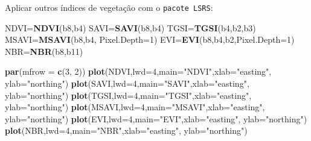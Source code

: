 \documentclass[
]{book}
\newenvironment{Shaded}{\begin{snugshade}}{\end{snugshade}}
\newcommand{\DataTypeTok}[1]{\textcolor[rgb]{0.13,0.29,0.53}{#1}}
\newcommand{\DecValTok}[1]{\textcolor[rgb]{0.00,0.00,0.81}{#1}}
\newcommand{\KeywordTok}[1]{\textcolor[rgb]{0.13,0.29,0.53}{\textbf{#1}}}
\newcommand{\NormalTok}[1]{#1}
\newcommand{\StringTok}[1]{\textcolor[rgb]{0.31,0.60,0.02}{#1}}
\begin{document}
Aplicar outros índices de vegetação com o \texttt{pacote\ LSRS}:

\begin{Shaded}
\begin{Highlighting}[]
\NormalTok{NDVI=}\KeywordTok{NDVI}\NormalTok{(b8,b4)}
\NormalTok{SAVI=}\KeywordTok{SAVI}\NormalTok{(b8,b4)}
\NormalTok{TGSI=}\KeywordTok{TGSI}\NormalTok{(b4,b2,b3)}
\NormalTok{MSAVI=}\KeywordTok{MSAVI}\NormalTok{(b8,b4, }\DataTypeTok{Pixel.Depth=}\DecValTok{1}\NormalTok{)}
\NormalTok{EVI=}\KeywordTok{EVI}\NormalTok{(b8,b4,b2,}\DataTypeTok{Pixel.Depth=}\DecValTok{1}\NormalTok{)}
\NormalTok{NBR=}\KeywordTok{NBR}\NormalTok{(b8,b11)}
\end{Highlighting}
\end{Shaded}

\begin{Shaded}
\begin{Highlighting}[]
\KeywordTok{par}\NormalTok{(}\DataTypeTok{mfrow =} \KeywordTok{c}\NormalTok{(}\DecValTok{3}\NormalTok{, }\DecValTok{2}\NormalTok{))}
\KeywordTok{plot}\NormalTok{(NDVI,}\DataTypeTok{lwd=}\DecValTok{4}\NormalTok{,}\DataTypeTok{main=}\StringTok{"NDVI"}\NormalTok{,}\DataTypeTok{xlab=}\StringTok{"easting"}\NormalTok{, }\DataTypeTok{ylab=}\StringTok{"northing"}\NormalTok{)}
\KeywordTok{plot}\NormalTok{(SAVI,}\DataTypeTok{lwd=}\DecValTok{4}\NormalTok{,}\DataTypeTok{main=}\StringTok{"SAVI"}\NormalTok{,}\DataTypeTok{xlab=}\StringTok{"easting"}\NormalTok{, }\DataTypeTok{ylab=}\StringTok{"northing"}\NormalTok{)}
\KeywordTok{plot}\NormalTok{(TGSI,}\DataTypeTok{lwd=}\DecValTok{4}\NormalTok{,}\DataTypeTok{main=}\StringTok{"TGSI"}\NormalTok{,}\DataTypeTok{xlab=}\StringTok{"easting"}\NormalTok{, }\DataTypeTok{ylab=}\StringTok{"northing"}\NormalTok{)}
\KeywordTok{plot}\NormalTok{(MSAVI,}\DataTypeTok{lwd=}\DecValTok{4}\NormalTok{,}\DataTypeTok{main=}\StringTok{"MSAVI"}\NormalTok{,}\DataTypeTok{xlab=}\StringTok{"easting"}\NormalTok{, }\DataTypeTok{ylab=}\StringTok{"northing"}\NormalTok{)}
\KeywordTok{plot}\NormalTok{(EVI,}\DataTypeTok{lwd=}\DecValTok{4}\NormalTok{,}\DataTypeTok{main=}\StringTok{"EVI"}\NormalTok{,}\DataTypeTok{xlab=}\StringTok{"easting"}\NormalTok{, }\DataTypeTok{ylab=}\StringTok{"northing"}\NormalTok{)}
\KeywordTok{plot}\NormalTok{(NBR,}\DataTypeTok{lwd=}\DecValTok{4}\NormalTok{,}\DataTypeTok{main=}\StringTok{"NBR"}\NormalTok{,}\DataTypeTok{xlab=}\StringTok{"easting"}\NormalTok{, }\DataTypeTok{ylab=}\StringTok{"northing"}\NormalTok{)}
\end{Highlighting}
\end{Shaded}
\end{document}
